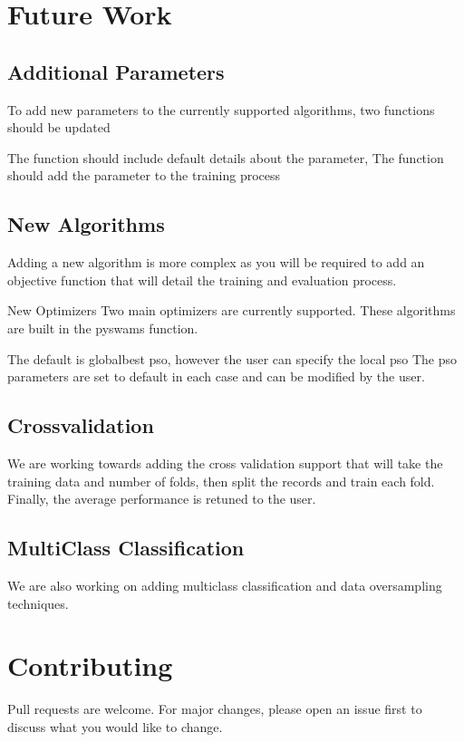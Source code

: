 \documentclass[letterpaper,10pt,english]{sphinxmanual}
\begin{document}
\chapter{Future Work}
\label{\detokenize{index:future-work}}

\section{Additional Parameters}
\label{\detokenize{index:additional-parameters}}
To add new parameters to the currently supported algorithms, two functions should be updated

The  function should include default details about the parameter,
The  function should add the parameter to the training process


\section{New Algorithms}
\label{\detokenize{index:new-algorithms}}
Adding a new algorithm is more complex as you will be required to add an objective function that will detail the training and evaluation process.

New Optimizers
Two main optimizers are currently supported. These algorithms are built in the pyswams function.

The default is globalbest pso, however the user can specify the local pso
The pso parameters are set to default in each case and can be modified by the user.


\section{Crossvalidation}
\label{\detokenize{index:crossvalidation}}
We are working towards adding the cross validation support that will take the training data and number of folds, then split the records and train each fold. Finally, the average performance is retuned to the user.


\section{Multi\sphinxhyphen{}Class Classification}
\label{\detokenize{index:multi-class-classification}}
We are also working on adding multi\sphinxhyphen{}class classification and data oversampling techniques.


\chapter{Contributing}
\label{\detokenize{index:contributing}}
Pull requests are welcome. For major changes, please open an issue first
to discuss what you would like to change.
\end{document}
